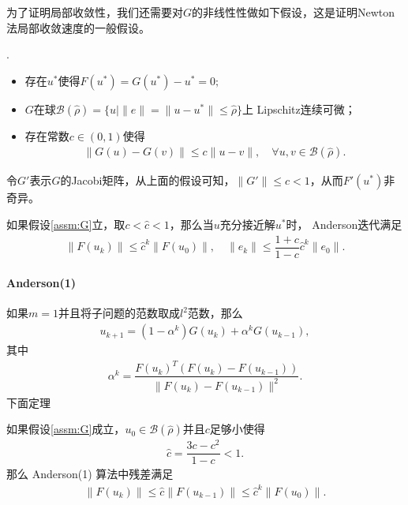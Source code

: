 	为了证明局部收敛性，我们还需要对$ G$的非线性性做如下假设，这是证明Newton法局部收敛速度的一般假设。
	\begin{assumption}.
		\label{assm:G}
		\begin{itemize}
			\item 存在$ u^* $使得$ F(u^*) =G(u^*) - u^* = 0; $
			\item $ G $在球$ \mathcal{B}(\hat{\rho}) = \{u|\|e\| = \|u-u^*\| \leq \hat{\rho}\} $上 Lipschitz连续可微；
			\item 存在常数$ c\in(0,1) $使得
			\begin{align*}
			\|G(u) - G(v)\|\leq c\|u - v\|,\quad \forall u,v\in\mathcal{B}(\hat{\rho}).
			\end{align*}
		\end{itemize}
	\end{assumption}

	令$G' $表示$G $的Jacobi矩阵，从上面的假设可知，$ \|G'\|\leq c<1 $，从而$ F'(u^*) $非奇异。
	
	\begin{theorem}
		如果假设\ref{assm:G}立，取$ c<\hat{c}<1 $，那么当$ u $充分接近解$ u^* $时， Anderson迭代满足
		\begin{align*}
		\|F(u_k)\|\leq \hat{c}^k\|F(u_0)\|,\quad \|e_k\| \leq \dfrac{1+c}{1-c}\hat{c}^k\|e_0\|.
		\end{align*}
	\end{theorem}
	
	
	\paragraph{Anderson(1)} 如果$ m = 1 $并且将子问题的范数取成$ l^2 $范数，那么
	\begin{align*}
	u_{k+1} = (1-\alpha^k)G(u_k) + \alpha^k G(u_{k-1}),
	\end{align*}
	其中
	\begin{align*}
	\alpha^k = \dfrac{F(u_k)^T(F(u_k) - F(u_{k-1}))}{\|F(u_k) - F(u_{k-1})\|^2}.
	\end{align*}
	下面定理
	\begin{theorem}
		如果假设\ref{assm:G}成立，$ u_0\in\mathcal{B}(\hat{\rho}) $并且$ c $足够小使得
		\begin{align*}
		\hat{c} = \dfrac{3c - c^2}{1-c}<1.
		\end{align*}
		那么 Anderson(1) 算法中残差满足
		\begin{align*}
		\|F(u_k)\| \leq \hat{c}\|F(u_{k-1})\| \leq \hat{c}^k\|F(u_0)\|.
		\end{align*}
	\end{theorem}

